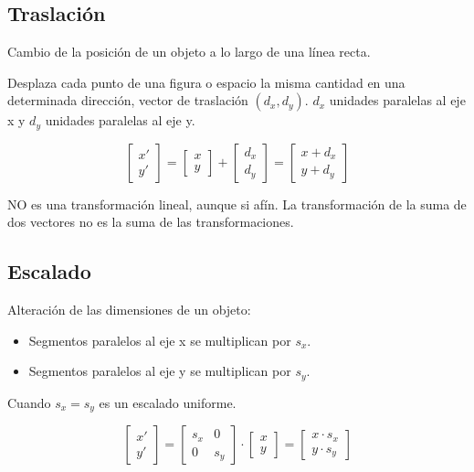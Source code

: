 \subsection{Traslación}
Cambio de la posición de un objeto a lo largo de una línea recta.

Desplaza cada punto de una figura o espacio la misma cantidad en una determinada dirección, vector de traslación $(d_x,d_y)$. $d_x$ unidades paralelas al eje x y $d_y$ unidades paralelas al eje y.

$$\left[\begin{matrix}
x' \\ y'
\end{matrix}\right] =
\left[\begin{matrix}
x \\ y
\end{matrix}\right]+
\left[\begin{matrix}
d_x \\ d_y
\end{matrix}\right]=
\left[\begin{matrix}
x+d_x \\ y+d_y
\end{matrix}\right]$$

NO es una transformación lineal, aunque si afín. La transformación de la suma de dos vectores no es la suma de las transformaciones.

\subsection{Escalado}
Alteración de las dimensiones de un objeto:
\begin{itemize}
    \item Segmentos paralelos al eje x se multiplican por $s_x$.
    \item Segmentos paralelos al eje y se multiplican por $s_y$.
\end{itemize}

Cuando $s_x = s_y$ es un escalado uniforme.

$$\left[\begin{matrix}
x' \\ y'
\end{matrix}\right] =
\left[\begin{matrix}
s_x & 0 \\ 0 & s_y
\end{matrix}\right] \cdot
\left[\begin{matrix}
x \\ y
\end{matrix}\right]=
\left[\begin{matrix}
x\cdot s_x \\ y\cdot s_y
\end{matrix}\right]$$

